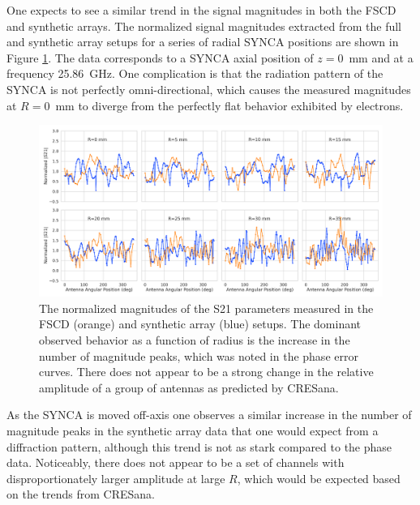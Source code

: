 One expects to see a similar trend in the signal magnitudes in both the FSCD and synthetic arrays. The normalized signal magnitudes extracted from the full and synthetic array setups for a series of radial SYNCA positions are shown in Figure \ref{fig:jugaad_synth_mag_curve_comp}. The data corresponds to a SYNCA axial position of $z=0$~mm and at a frequency 25.86~GHz. One complication is that the radiation pattern of the SYNCA is not perfectly omni-directional, which causes the measured magnitudes at $R=0$~mm to diverge from the perfectly flat behavior exhibited by electrons.
\begin{figure}[htbp]
    \centering
    \includegraphics[width=1\textwidth]{figs/Chapter-5/230412_jugaad_mag_curves_z0.png}
    \caption{The normalized magnitudes of the S21 parameters measured in the FSCD (orange) and synthetic array (blue) setups. The dominant observed behavior as a function of radius is the increase in the number of magnitude peaks, which was noted in the phase error curves. There does not appear to be a strong change in the relative amplitude of a group of antennas as predicted by CRESana.}
    \label{fig:jugaad_synth_mag_curve_comp}
\end{figure}

As the SYNCA is moved off-axis one observes a similar increase in the number of magnitude peaks in the synthetic array data that one would expect from a diffraction pattern, although this trend is not as stark compared to the phase data. Noticeably, there does not appear to be a set of channels with disproportionately larger amplitude at large $R$, which would be expected based on the trends from CRESana. 

